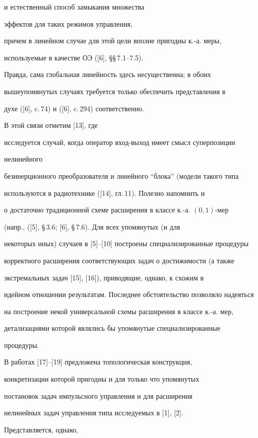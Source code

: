 и естественный способ замыкания множества


эффектов для таких режимов управления,


причем в линейном случае для этой цели вполне пригодны к.-а. меры,


используемые в качестве ОЭ ([6], \S\S\,7.1--7.5).


Правда, сама глобальная линейность здесь несущественна; в обоих


вышеупомянутых случаях требуется только обеспечить представления в


духе ([6], c.\,74) и ([6], c.\,294) соответственно.


В этой связи отметим [13], где


исследуется случай, когда оператор вход-выход имеет смысл суперпозиции


нелинейного


безинерционного преобразователя и линейного ``блока'' (модели такого типа


используются в радиотехнике ([14], гл.\,11). Полезно напомнить и


о достаточно традиционной схеме расширения в классе к.-а. $(0,1)$-мер


(напр., ([5], \S\,3.6; [6], \S\,7.6). Для всех упомянутых (и для


некоторых иных) случаев в [5]--[10] построены специализированные процедуры


корректного расширения соответствующих задач о достижимости (а также


экстремальных задач [15], [16]), приводящие, однако, к схожим в


идейном отношении результатам. Последнее обстоятельство позволяло надеяться


на построение некой универсальной схемы расширения в классе к.-а. мер,


детализациями которой являлись бы упомянутые специализированные


процедуры.





В работах [17]--[19] предложена топологическая конструкция,


конкретизации которой пригодны и для только что упомянутых


постановок задач импульсного управления и для расширения


нелинейных задач управления типа исследуемых в [1], [2].


Представляется, однако,


